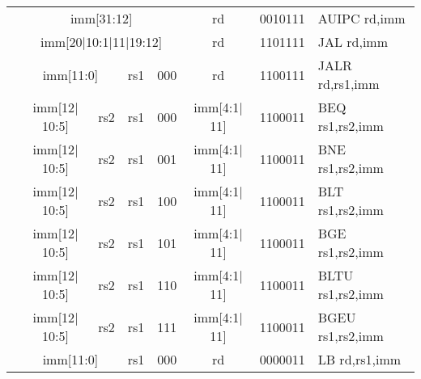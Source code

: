\begin{table}[p]
\begin{small}
\begin{center}
\begin{tabular}{p{0in}p{0.4in}p{0.05in}p{0.05in}p{0.05in}p{0.05in}p{0.4in}p{0.6in}p{0.4in}p{0.6in}p{0.7in}l}
&
\multicolumn{8}{|c|}{imm[31:12]} &
\multicolumn{1}{c|}{rd} &
\multicolumn{1}{c|}{0010111} & AUIPC rd,imm \\
\cline{2-11}
  

&
\multicolumn{8}{|c|}{imm[20$\vert$10:1$\vert$11$\vert$19:12]} &
\multicolumn{1}{c|}{rd} &
\multicolumn{1}{c|}{1101111} & JAL rd,imm \\
\cline{2-11}
  

&
\multicolumn{6}{|c|}{imm[11:0]} &
\multicolumn{1}{c|}{rs1} &
\multicolumn{1}{c|}{000} &
\multicolumn{1}{c|}{rd} &
\multicolumn{1}{c|}{1100111} & JALR rd,rs1,imm \\
\cline{2-11}
  

&
\multicolumn{4}{|c|}{imm[12$\vert$10:5]} &
\multicolumn{2}{c|}{rs2} &
\multicolumn{1}{c|}{rs1} &
\multicolumn{1}{c|}{000} &
\multicolumn{1}{c|}{imm[4:1$\vert$11]} &
\multicolumn{1}{c|}{1100011} & BEQ rs1,rs2,imm \\
\cline{2-11}
  

&
\multicolumn{4}{|c|}{imm[12$\vert$10:5]} &
\multicolumn{2}{c|}{rs2} &
\multicolumn{1}{c|}{rs1} &
\multicolumn{1}{c|}{001} &
\multicolumn{1}{c|}{imm[4:1$\vert$11]} &
\multicolumn{1}{c|}{1100011} & BNE rs1,rs2,imm \\
\cline{2-11}
  

&
\multicolumn{4}{|c|}{imm[12$\vert$10:5]} &
\multicolumn{2}{c|}{rs2} &
\multicolumn{1}{c|}{rs1} &
\multicolumn{1}{c|}{100} &
\multicolumn{1}{c|}{imm[4:1$\vert$11]} &
\multicolumn{1}{c|}{1100011} & BLT rs1,rs2,imm \\
\cline{2-11}
  

&
\multicolumn{4}{|c|}{imm[12$\vert$10:5]} &
\multicolumn{2}{c|}{rs2} &
\multicolumn{1}{c|}{rs1} &
\multicolumn{1}{c|}{101} &
\multicolumn{1}{c|}{imm[4:1$\vert$11]} &
\multicolumn{1}{c|}{1100011} & BGE rs1,rs2,imm \\
\cline{2-11}
  

&
\multicolumn{4}{|c|}{imm[12$\vert$10:5]} &
\multicolumn{2}{c|}{rs2} &
\multicolumn{1}{c|}{rs1} &
\multicolumn{1}{c|}{110} &
\multicolumn{1}{c|}{imm[4:1$\vert$11]} &
\multicolumn{1}{c|}{1100011} & BLTU rs1,rs2,imm \\
\cline{2-11}
  

&
\multicolumn{4}{|c|}{imm[12$\vert$10:5]} &
\multicolumn{2}{c|}{rs2} &
\multicolumn{1}{c|}{rs1} &
\multicolumn{1}{c|}{111} &
\multicolumn{1}{c|}{imm[4:1$\vert$11]} &
\multicolumn{1}{c|}{1100011} & BGEU rs1,rs2,imm \\
\cline{2-11}
  

&
\multicolumn{6}{|c|}{imm[11:0]} &
\multicolumn{1}{c|}{rs1} &
\multicolumn{1}{c|}{000} &
\multicolumn{1}{c|}{rd} &
\multicolumn{1}{c|}{0000011} & LB rd,rs1,imm \\
\cline{2-11}
  


\end{tabular}
\end{center}
\end{small}
\end{table}
